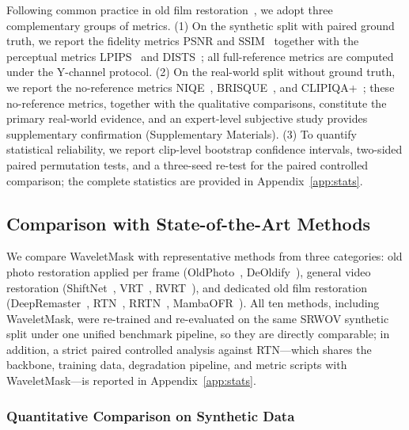 {Following common practice in old film restoration~\cite{rtn2022,rrtn2024,mao2025mambaofr}, we adopt three complementary groups of metrics. (1) On the synthetic split with paired ground truth, we report the fidelity metrics PSNR and SSIM~\cite{wang2004ssim} together with the perceptual metrics LPIPS~\cite{zhang2018lpips} and DISTS~\cite{ding2020dists}; all full-reference metrics are computed under the Y-channel protocol. (2) On the real-world split without ground truth, we report the no-reference metrics NIQE~\cite{mittal2013niqe}, BRISQUE~\cite{mittal2012brisque}, and CLIPIQA+~\cite{wang2023clipiqa}; these no-reference metrics, together with the qualitative comparisons, constitute the primary real-world evidence, and an expert-level subjective study provides supplementary confirmation (Supplementary Materials). (3) To quantify statistical reliability, we report clip-level bootstrap confidence intervals, two-sided paired permutation tests, and a three-seed re-test for the paired controlled comparison; the complete statistics are provided in Appendix~\ref{app:stats}.

\subsection{Comparison with State-of-the-Art Methods}\label{subsec:sota}

We compare WaveletMask with representative methods from three categories: old photo restoration applied per frame (OldPhoto~\cite{wan2020bringing}, DeOldify~\cite{jantic2019deoldify}), general video restoration (ShiftNet~\cite{li2023shiftnet}, VRT~\cite{liang2024vrt}, RVRT~\cite{liang2022rvrt}), and dedicated old film restoration (DeepRemaster~\cite{iizuka2019deepremaster}, RTN~\cite{rtn2022}, RRTN~\cite{rrtn2024}, MambaOFR~\cite{mao2025mambaofr}). All ten methods, including WaveletMask, were re-trained and re-evaluated on the same SRWOV synthetic split under one unified benchmark pipeline, so they are directly comparable; in addition, a strict paired controlled analysis against RTN---which shares the backbone, training data, degradation pipeline, and metric scripts with WaveletMask---is reported in Appendix~\ref{app:stats}.

\subsubsection{Quantitative Comparison on Synthetic Data}\label{subsec:sota_quant}

}
